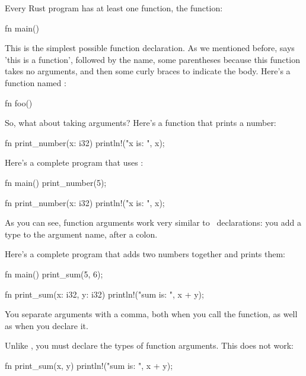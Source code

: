 Every Rust program has at least one function, the  function:

\begin{rustc}
fn main() {
}
\end{rustc}

This is the simplest possible function declaration. As we mentioned before,  says 'this is a function', followed by 
the name, some parentheses because this function takes no arguments, and then some curly braces to indicate the body. Here's 
a function named :

\begin{rustc}
fn foo() {
}
\end{rustc}

So, what about taking arguments? Here's a function that prints a number:

\begin{rustc}
fn print_number(x: i32) {
  println!("x is: {}", x);
}
\end{rustc}

Here's a complete program that uses :

\begin{rustc}
fn main() {
    print_number(5);
}

fn print_number(x: i32) {
    println!("x is: {}", x);
}
\end{rustc}

As you can see, function arguments work very similar to \keylet\ declarations: you add a type to the argument name, after a 
colon.

\blank

Here's a complete program that adds two numbers together and prints them:

\begin{rustc}
fn main() {
    print_sum(5, 6);
}

fn print_sum(x: i32, y: i32) {
    println!("sum is: {}", x + y);
}
\end{rustc}

You separate arguments with a comma, both when you call the function, as well as when you declare it.

\blank

Unlike \keylet, you must declare the types of function arguments. This does not work:

\begin{rustc}
fn print_sum(x, y) {
    println!("sum is: {}", x + y);
}
\end{rustc}

